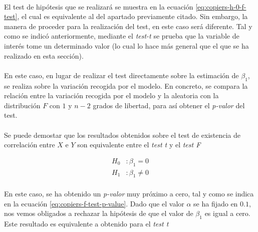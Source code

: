 \documentclass{article}
\begin{document}
        \paragraph{}
        El test de hipótesis que se realizará se muestra en la ecuación \eqref{eq:copiers-h-0-f-test}, el cual es equivalente al del apartado previamente citado. Sin embargo, la manera de proceder para la realización del test, en este caso será diferente. Tal y como se indicó anteriormente, mediante el \emph{test-t} se prueba que la variable de interés tome un determinado valor (lo cual lo hace más general que el que se ha realizado en esta sección).

        \paragraph{}
        En este caso, en lugar de realizar el test directamente sobre la estimación de $\beta_1$, se realiza sobre la variación recogida por el modelo. En concreto, se compara la relación entre la variación recogida por el modelo y la aleatoria con la distribución $F$ con $1$ y $n-2$ grados de libertad, para así obtener el \emph{p-valor} del test.

        \paragraph{}
        Se puede demostar que los resultados obtenidos sobre el test de existencia de correlación entre $X$ e $Y$ son equivalente entre el \emph{test t} y el \emph{test F}

        \begin{equation}
          \label{eq:copiers-h-0-f-test}
          \begin{split}
            H_0&: \beta_1 = 0 \\
            H_1&: \beta_1 \neq 0
          \end{split}
        \end{equation}

        \paragraph{}
        En este caso, se ha obtenido un \emph{p-valor} muy próximo a cero, tal y como se indica en la ecuación \eqref{eq:copiers-f-test-p-value}. Dado que el valor $\alpha$ se ha fijado en $0.1$, nos vemos obligados a rechazar la hipótesis de que el valor de $\beta_1$ es igual a cero. Este resultado es equivalente a obtenido para el \emph{test t}
\end{document}
